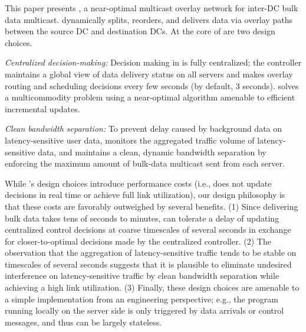 This paper presents {\em \name}, a near-optimal multicast 
overlay network for inter-DC bulk data multicast.
\name dynamically splits, reorders, and delivers data via 
overlay paths between the source DC and destination DCs.
At the core of \name are two design choices.
\begin{packeditemize} 
\item {\em Centralized decision-making:} 
Decision making in \name is fully centralized; the \name 
controller maintains a global view of data delivery status on 
all servers 
and makes overlay routing and scheduling decisions every 
few seconds (by default, 3 seconds).
\name solves a multicommodity problem using 
a near-optimal algorithm amenable to efficient incremental 
updates.
\item {\em Clean bandwidth separation:}
To prevent delay caused by background data on 
latency-sensitive user data, \name monitors the 
aggregated traffic volume 
of latency-sensitive data, and maintains a clean, dynamic 
bandwidth 
separation by enforcing the maximum amount of bulk-data 
multicast sent from each server. 
\end{packeditemize}

While \name's design choices introduce performance costs (i.e.,
\name does not update decisions in real time or achieve full 
link utilization), our design philosophy is that these costs are 
favorably outweighed by several benefits.
(1) Since delivering bulk data takes tens of seconds to 
minutes, \name can tolerate a delay of updating centralized 
control decisions at coarse timescales of several 
seconds in exchange for closer-to-optimal decisions made by  
the centralized controller.
(2) The observation that the aggregation of 
latency-sensitive traffic tends to 
be stable on timescales of several seconds suggests that it is 
plausible to eliminate undesired interference on 
latency-sensitive traffic by clean bandwidth separation 
while achieving a high link utilization.
(3) Finally, these design choices are amenable to a simple
implementation from an engineering perspective;
e.g., the program running locally on the server side is 
only triggered by data arrivals or control messages, and 
thus can be largely stateless.


